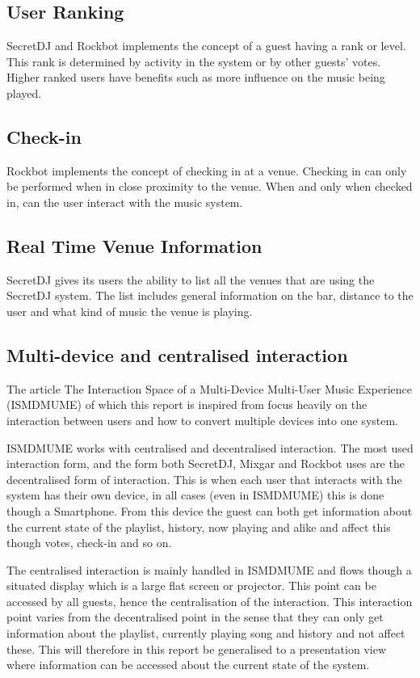 \subsection{User Ranking}
SecretDJ and Rockbot implements the concept of a guest having a rank or
level. This rank is determined by activity in the system or by other
guests' votes. Higher ranked users have benefits such as more influence on the music being played.

\subsection{Check-in}
Rockbot implements the concept of checking in at a venue. Checking in
can only be performed when in close proximity to the venue. When and
only when checked in, can the user interact with the music system.

\subsection{Real Time Venue Information}
SecretDJ gives its users the ability to list all the venues that are
using the SecretDJ system. The list includes general information on
the bar, distance to the user and what kind of music the venue is
playing.

\subsection{Multi-device and centralised interaction}
The article The Interaction Space of a Multi-Device Multi-User Music Experience (ISMDMUME) \cite{soerensen2004} of which this report is inspired from focus heavily on the interaction between users and how to convert multiple devices into one system.

ISMDMUME works with centralised and decentralised interaction. The most used interaction form, and the form both SecretDJ, Mixgar and Rockbot uses are the decentralised form of interaction. This is when each user that interacts with the system has their own device, in all cases (even in ISMDMUME) this is done though a Smartphone. From this device the guest can both get information about the current state of the playlist, history, now playing and alike and affect this though votes, check-in and so on.

The centralised interaction is mainly handled in ISMDMUME and flows though a situated display which is a large flat screen or projector. This point can be accessed by all guests, hence the centralisation of the interaction. This interaction point varies from the decentralised point in the sense that they can only get information about the playlist, currently playing song and history and not affect these. This will therefore in this report be generalised to a presentation view where information can be accessed about the current state of the system.